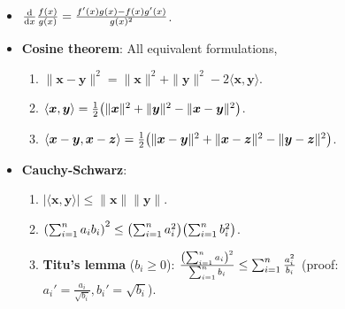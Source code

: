 \documentclass[8pt,a4paper]{extarticle}
\newcommand{\lft}{\mathopen{}\mathclose\bgroup\left}
\newcommand{\rgt}{\aftergroup\egroup\right}
\renewcommand{\vec}[1]{\bm{#1}}
\newenvironment{topic}[1]
{\textbf{\sffamily \colorbox{black}{\rlap{\textbf{\textcolor{white}{#1}}}\hspace{\linewidth}\hspace{-2\fboxsep}}} \\ \vspace{0.2cm}}
{}
\begin{document}
\begin{multicols*}{2}
    \begin{topic}{Lemmas}
        \begin{itemize}
            \item $\odv*{\frac{f(x)}{g(x)}}{x} = \frac{f'(x) g(x) - f(x) g'(x)}{g(x)^2}$.
            \item \textbf{Cosine theorem}: All equivalent formulations,
                  \begin{enumerate}
                      \item $\| \vec{x} - \vec{y} \|^2 = \| \vec{x} \|^2 + \| \vec{y} \|^2 - 2 \langle \vec{x}, \vec{y} \rangle$.
                      \item $\langle \vec{x}, \vec{y} \rangle = \frac{1}{2} \lft( \| \vec{x} \|^2 + \| \vec{y} \|^2 - \| \vec{x} - \vec{y} \|^2 \rgt)$.
                      \item $\langle \vec{x} - \vec{y}, \vec{x} - \vec{z} \rangle = \frac{1}{2} \lft( \| \vec{x} - \vec{y} \|^2 + \| \vec{x} - \vec{z} \|^2 - \| \vec{y} - \vec{z} \|^2 \rgt)$.
                  \end{enumerate}
            \item \textbf{Cauchy-Schwarz}:
                  \begin{enumerate}
                      \item $|\langle \vec{x}, \vec{y} \rangle| \leq \| \vec{x} \| \| \vec{y} \|$.
                      \item $\lft( \sum_{i=1}^{n} a_i b_i \rgt)^2 \leq \lft( \sum_{i=1}^{n} a_i^2 \rgt) \lft( \sum_{i=1}^{n} b_i^2 \rgt)$.
                      \item \textbf{Titu's lemma} ($b_i \geq 0$): $\frac{\lft( \sum_{i=1}^{n} a_i \rgt)^2}{\sum_{i=1}^{n} b_i} \leq \sum_{i=1}^{n} \frac{a_i^2}{b_i}$ (proof: $a_i' = \frac{a_i}{\sqrt{b_i}}, b_i' = \sqrt{b_i}$).
                  \end{enumerate}


\end{itemize}
\end{topic}
\end{multicols*}
\end{document}
